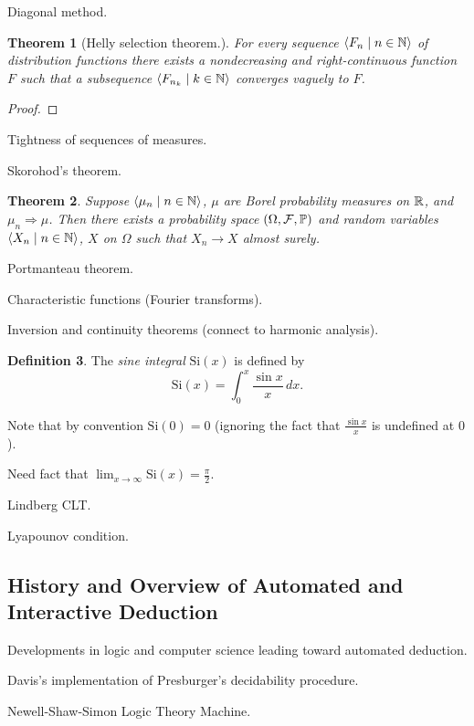 \documentclass{amsart}
\newtheorem{theorem}{Theorem}[section]
\theoremstyle{definition}
\newtheorem{definition}[theorem]{Definition}
\theoremstyle{remark}
\newcommand{\bldseq}[2]{\langle{#1}\mid{#2}\rangle}
\newcommand\Si{\text{Si}}
\begin{document}
Diagonal method.

\begin{theorem}[Helly selection theorem.]
For every sequence $\bldseq{F_n}{n \in \N}$ of distribution functions there exists a nondecreasing and right-continuous function $F$ such that a subsequence $\bldseq{F_{n_k}}{k \in \N}$ converges vaguely to $F$.
\end{theorem}

\begin{proof}
\end{proof}

Tightness of sequences of measures.

Skorohod's theorem.

\begin{theorem}
Suppose $\bldseq{\mu_n}{n \in \N}$, $\mu$ are Borel probability measures on $\R$, and $\mu_n \Rightarrow \mu$. Then there exists a probability space $(\Omega, \mathcal F, \P)$ and random variables $\bldseq{X_n}{n \in \N}$, $X$ on $\Omega$ such that $X_n \rightarrow X$ almost surely.
\end{theorem}

Portmanteau theorem.

Characteristic functions (Fourier transforms).

Inversion and continuity theorems (connect to harmonic analysis).

\begin{definition}
The {\em sine integral} $\Si(x)$ is defined by
\[ \Si(x) = \int_0^x \frac{\sin x}{x} \, dx. \]
\end{definition}

Note that by convention $\Si(0) = 0$ (ignoring the fact that $\frac{\sin x}{x}$ is undefined at $0$).

Need fact that $\lim_{x \rightarrow \infty} \Si(x) = \frac{\pi}{2}$.

Lindberg CLT.

Lyapounov condition.

\subsection{History and Overview of Automated and Interactive Deduction} \label{AutoDed}

Developments in logic and computer science leading toward automated deduction.

Davis's implementation of Presburger's decidability procedure.

Newell-Shaw-Simon Logic Theory Machine.
\end{document}
